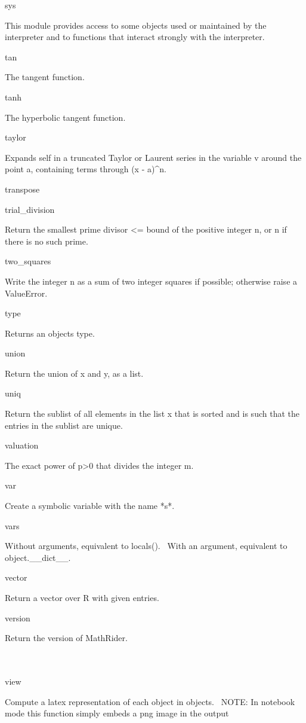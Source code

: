 \documentclass[12pt,twoside]{book}
\begin{document}
sys

This module provides access to some objects used or maintained by the
interpreter and to functions that interact strongly with the
interpreter.

tan

The tangent function.

tanh

The hyperbolic tangent function.

taylor

Expands self in a truncated Taylor or Laurent series in the variable v
around the point a, containing terms through (x {}- a)\^{}n.

transpose


\bigskip

trial\_division

Return the smallest prime divisor {\textless}= bound of the positive
integer n, or n if there is no such prime.

two\_squares

Write the integer n as a sum of two integer squares if possible;
otherwise raise a ValueError.

type

Returns an object{\textquotesingle}s type.

union

Return the union of x and y, as a list.

uniq

Return the sublist of all elements in the list x that is sorted and is
such that the entries in the sublist are unique.

valuation

The exact power of p{\textgreater}0 that divides the integer m.

var

Create a symbolic variable with the name *s*.

vars

Without arguments, equivalent to locals(). \ With an argument,
equivalent to object.\_\_dict\_\_.

vector

Return a vector over R with given entries.

version

Return the version of MathRider.
\ \ \ \ \ \ \ \ \ \ \ \ \ \ \ \ \ \ \ \ \ \ \ \ \ \ \ \ \ \ \ \ \ \ \ \ \ \ \ \ \ \ \ \ \ \ \ \ \ \ \ \ \ \ \ \ \ \ \ \ \ \ \ \ \ \ \ \ \ \ \ \ \ \ \ \ \ \ \ \ \ \ \ \ \ 

view

Compute a latex representation of each object in objects. \ NOTE: In
notebook mode this function simply embeds a png image in the output 
\end{document}
